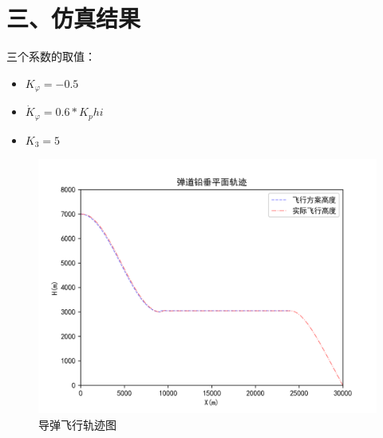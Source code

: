 \documentclass[UTF8]{ctexart}
\begin{document}
\section*{ 三、仿真结果}

    
三个系数的取值：
    \begin{itemize}
        \item[]$K_\varphi = - 0.5$
        \item[]$\dot{K}_\varphi= 0.6* K_phi$
        \item[]$K_3= 5$
    \end{itemize}



\begin{figure}[H]
    \centering
    \includegraphics[width=130mm]{../img/飞行轨迹.png}
    \caption{导弹飞行轨迹图}
\end{figure}
\end{document}
